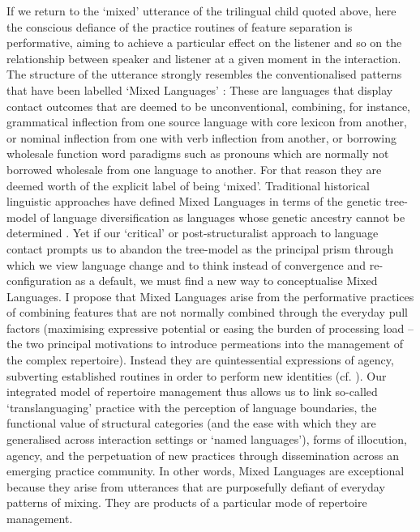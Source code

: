 \documentclass[output=paper]{langscibook}
\begin{document}
If we return to the ‘mixed’ utterance of the trilingual child quoted above, here the conscious defiance of the practice routines of feature separation is performative, aiming to achieve a particular effect on the listener and so on the relationship between speaker and listener at a given moment in the interaction. The structure of the utterance strongly resembles the conventionalised patterns that have been labelled ‘Mixed Languages’ \citep{bakker_mixed_2003}: These are languages that display contact outcomes that are deemed to be unconventional, combining, for instance, grammatical inflection from one source language with core lexicon from another, or nominal inflection from one with verb inflection from another, or borrowing wholesale function word paradigms such as pronouns which are normally not borrowed wholesale from one language to another. For that reason they are deemed worth of the explicit label of being ‘mixed’. Traditional historical linguistic approaches have defined Mixed Languages in terms of the genetic tree-model of language diversification as languages whose genetic ancestry cannot be determined \citep{thomason_language_1988}. Yet if our ‘critical’ or post-structuralist approach to language contact prompts us to abandon the tree-model as the principal prism through which we view language change and to think instead of convergence and re-configuration as a default, we must find a new way to conceptualise Mixed Languages. I propose that Mixed Languages arise from the performative practices of combining features that are not normally combined through the everyday pull factors (maximising expressive potential or easing the burden of processing load – the two principal motivations to introduce permeations into the management of the complex repertoire). Instead they are quintessential expressions of agency, subverting established routines in order to perform new identities 
(cf. \citealt{matras_repertoire_2021b}). 
Our integrated model of repertoire management thus allows us to link so-called ‘translanguaging’ practice with the perception of language boundaries, the functional value of structural categories (and the ease with which they are generalised across interaction settings or ‘named languages’), forms of illocution, agency, and the perpetuation of new practices through dissemination across an emerging practice community. In other words, Mixed Languages are exceptional because they arise from utterances that are purposefully defiant of everyday patterns of mixing. They are products of a particular mode of repertoire management.
\end{document}

